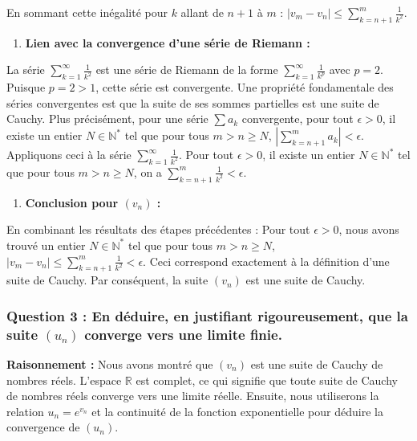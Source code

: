 \documentclass[a4paper,11pt]{report}
\begin{document}
    En sommant cette inégalité pour $k$ allant de $n+1$ à $m$ :
    $|v_m - v_n| \le \sum_{k=n+1}^m \frac{1}{k^2}$.
\begin{enumerate}
\item \textbf{Lien avec la convergence d'une série de Riemann :}
\end{enumerate}
    La série $\sum_{k=1}^\infty \frac{1}{k^2}$ est une série de Riemann de la forme $\sum_{k=1}^\infty \frac{1}{k^p}$ avec $p=2$.
    Puisque $p=2 > 1$, cette série est convergente.
    Une propriété fondamentale des séries convergentes est que la suite de ses sommes partielles est une suite de Cauchy. Plus précisément, pour une série $\sum a_k$ convergente, pour tout $\epsilon > 0$, il existe un entier $N \in \mathbb{N}^*$ tel que pour tous $m > n \ge N$, $|\sum_{k=n+1}^m a_k| < \epsilon$.
    Appliquons ceci à la série $\sum_{k=1}^\infty \frac{1}{k^2}$. Pour tout $\epsilon > 0$, il existe un entier $N \in \mathbb{N}^*$ tel que pour tous $m > n \ge N$, on a $\sum_{k=n+1}^m \frac{1}{k^2} < \epsilon$.
\begin{enumerate}
\item \textbf{Conclusion pour $(v_n)$ :}
\end{enumerate}
    En combinant les résultats des étapes précédentes :
    Pour tout $\epsilon > 0$, nous avons trouvé un entier $N \in \mathbb{N}^*$ tel que pour tous $m > n \ge N$,
    $|v_m - v_n| \le \sum_{k=n+1}^m \frac{1}{k^2} < \epsilon$.
    Ceci correspond exactement à la définition d'une suite de Cauchy.
    Par conséquent, la suite $(v_n)$ est une suite de Cauchy.

\subsubsection*{Question 3 : En déduire, en justifiant rigoureusement, que la suite $(u_n)$ converge vers une limite finie.}

\textbf{Raisonnement :}
Nous avons montré que $(v_n)$ est une suite de Cauchy de nombres réels. L'espace $\mathbb{R}$ est complet, ce qui signifie que toute suite de Cauchy de nombres réels converge vers une limite réelle. Ensuite, nous utiliserons la relation $u_n = e^{v_n}$ et la continuité de la fonction exponentielle pour déduire la convergence de $(u_n)$.
\end{document}

